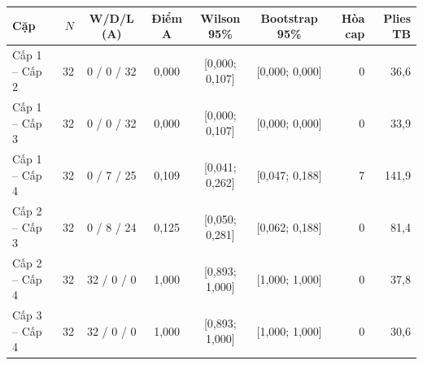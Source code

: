\begin{tabular}{l r c c c c r r}
\toprule
Cặp & $N$ & W/D/L (A) & Điểm A & Wilson 95\% & Bootstrap 95\% & Hòa cap & Plies TB \\
\midrule
Cấp 1 -- Cấp 2 & 32 & 0 / 0 / 32 & 0,000 & {[0,000; 0,107]} & {[0,000; 0,000]} & 0 & 36,6 \\
Cấp 1 -- Cấp 3 & 32 & 0 / 0 / 32 & 0,000 & {[0,000; 0,107]} & {[0,000; 0,000]} & 0 & 33,9 \\
Cấp 1 -- Cấp 4 & 32 & 0 / 7 / 25 & 0,109 & {[0,041; 0,262]} & {[0,047; 0,188]} & 7 & 141,9 \\
Cấp 2 -- Cấp 3 & 32 & 0 / 8 / 24 & 0,125 & {[0,050; 0,281]} & {[0,062; 0,188]} & 0 & 81,4 \\
Cấp 2 -- Cấp 4 & 32 & 32 / 0 / 0 & 1,000 & {[0,893; 1,000]} & {[1,000; 1,000]} & 0 & 37,8 \\
Cấp 3 -- Cấp 4 & 32 & 32 / 0 / 0 & 1,000 & {[0,893; 1,000]} & {[1,000; 1,000]} & 0 & 30,6 \\
\bottomrule
\end{tabular}
